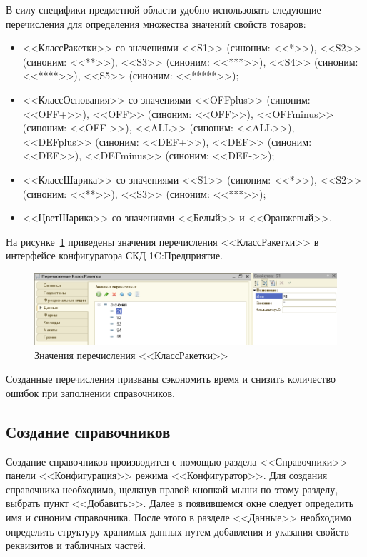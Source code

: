 В силу специфики предметной области удобно использовать следующие
перечисления для определения множества значений свойств товаров:
\begin{itemize}
\item <<КлассРакетки>> со значениями
  <<S1>> (синоним: <<*>>),
  <<S2>> (синоним: <<**>>),
  <<S3>> (синоним: <<***>>),
  <<S4>> (синоним: <<****>>),
  <<S5>> (синоним: <<*****>>);
\item <<КлассОснования>> со значениями
  <<OFFplus>> (синоним: <<OFF+>>),
  <<OFF>> (синоним: <<OFF>>),
  <<OFFminus>> (синоним: <<OFF->>),
  <<ALL>> (синоним: <<ALL>>),
  <<DEFplus>> (синоним: <<DEF+>>),
  <<DEF>> (синоним: <<DEF>>),
  <<DEFminus>> (синоним: <<DEF->>);
\item <<КлассШарика>> со значениями
  <<S1>> (синоним: <<*>>),
  <<S2>> (синоним: <<**>>),
  <<S3>> (синоним: <<***>>);
\item <<ЦветШарика>> со значениями
  <<Белый>> и
  <<Оранжевый>>.
\end{itemize}

На рисунке~\ref{fig:enum} приведены
значения перечисления <<КлассРакетки>> в интерфейсе конфигуратора
СКД 1C:Предприятие.

\begin{figure}[h!]
  \centering
  \includegraphics[width=150mm]{pic/enum}
  \caption{Значения перечисления <<КлассРакетки>>}
  \label{fig:enum}
\end{figure}

Созданные перечисления призваны сэкономить время и снизить количество
ошибок при заполнении справочников.

\subsection{Создание справочников}

Создание справочников производится с помощью раздела <<Справочники>>
панели <<Конфигурация>> режима <<Конфигуратор>>.
Для создания справочника необходимо, щелкнув правой кнопкой мыши по этому
разделу, выбрать пункт <<Добавить>>. Далее в появившемся окне
следует определить имя и синоним справочника.
После этого в разделе <<Данные>> необходимо определить структуру
хранимых данных путем добавления и указания свойств реквизитов
и табличных частей.

